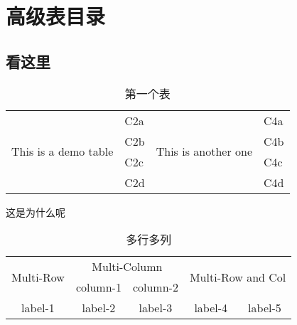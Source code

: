 \chapter{高级表目录}

\section{看这里}
\begin{table}[ht]
	\centering
	\caption{第一个表}
	\label{tb:2-1}
	\begin{tabular}{|l|l|l|l|} 
		\hline  
		\multirow{4}{2cm}{This is a demo table}   & C2a &  \multirow{4}{2cm}{This is another one} & C4a\\ 
		& C2b &  & C4b\\ 
		& C2c &  & C4c\\ 
		& C2d & & C4d\\ 
		\hline 
	\end{tabular} 
\end{table}
这是为什么呢
\begin{table}
	\centering
	\caption{多行多列}
	\label{tb:2-2}
	\begin{tabular}{|c|c|c|c|c|}
		\hline
		\multirow{2}{*}{Multi-Row} &
		\multicolumn{2}{c|}{Multi-Column} &
		\multicolumn{2}{c|}{\multirow{2}{*}{Multi-Row and Col}} \\
		\cline{2-3}
		& column-1 & column-2 & \multicolumn{2}{c|}{} \\
		\hline
		label-1 & label-2 & label-3 & label-4 & label-5 \\
		\hline
	\end{tabular}
\end{table}



